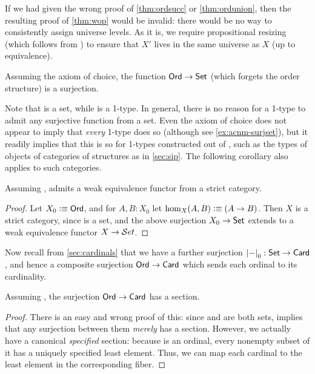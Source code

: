 \begin{rmk}
  If we had given the wrong proof of \autoref{thm:ordsucc} or \autoref{thm:ordunion}, then the resulting proof of \autoref{thm:wop} would be invalid: there would be no way to consistently assign universe levels.
  As it is, we require propositional resizing (which follows from \LEM{}) to ensure that $X'$ lives in the same universe as $X$ (up to equivalence).
\end{rmk}

\begin{cor}
  Assuming the axiom of choice, the function $\mathsf{Ord}\to\mathsf{Set}$ (which forgets the order structure) is a surjection.
\end{cor}

Note that \ord is a set, while \set is a 1-type.
In general, there is no reason for a 1-type to admit any surjective function from a set.
Even the axiom of choice does not appear to imply that \emph{every} 1-type does so (although see \autoref{ex:acnm-surjset}), but it readily implies that this is so for 1-types constructed out of \set, such as the types of objects of categories of structures as in \autoref{sec:sip}.
The following corollary also applies to such categories.

\begin{cor}
  Assuming \choice{}, \uset admits a weak equivalence functor from a strict category.
\end{cor}
\begin{proof}
  Let $X_0\vcentcolon\equiv \mathsf{Ord}$, and for $A,B:X_0$ let $\hom_X(A,B) \vcentcolon\equiv (A\to B)$.
  Then $X$ is a strict category, since \ord is a set, and the above surjection $X_0 \to \mathsf{Set}$ extends to a weak equivalence functor $X\to \mathcal{S}et$.
\end{proof}

Now recall from \autoref{sec:cardinals} that we have a further surjection $\mathopen{}\left|-\right|_{0}^{}\mathclose{}:\mathsf{Set}\to\mathsf{Card}$, and hence a composite surjection $\mathsf{Ord}\to\mathsf{Card}$ which sends each ordinal to its cardinality.

\begin{thm}
  Assuming \choice{}, the surjection $\mathsf{Ord}\to\mathsf{Card}$ has a section.
\end{thm}
\begin{proof}
  There is an easy and wrong proof of this: since \ord and \card are both sets, \choice{} implies that any surjection between them \emph{merely} has a section.
  However, we actually have a canonical \emph{specified} section: because \ord is an ordinal, every nonempty subset of it has a uniquely specified least element.
  Thus, we can map each cardinal to the least element in the corresponding fiber.
\end{proof}

